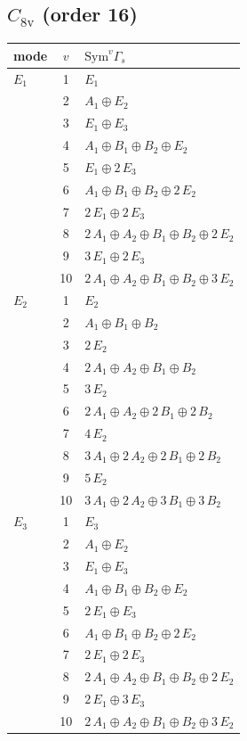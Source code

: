 \documentclass[11pt]{article}
\begin{document}
\subsection*{$C_{8\mathrm{v}}$ \quad (order 16)}
\begin{longtable}{l c p{}}
\hline mode & $v$ & $\mathrm{Sym}^v\Gamma_s$\\ \hline\endhead
$E_{1}$ & 1 & $E_{1}$\\
 & 2 & $A_{1}\oplus E_{2}$\\
 & 3 & $E_{1}\oplus E_{3}$\\
 & 4 & $A_{1}\oplus B_{1}\oplus B_{2}\oplus E_{2}$\\
 & 5 & $E_{1}\oplus 2\,E_{3}$\\
 & 6 & $A_{1}\oplus B_{1}\oplus B_{2}\oplus 2\,E_{2}$\\
 & 7 & $2\,E_{1}\oplus 2\,E_{3}$\\
 & 8 & $2\,A_{1}\oplus A_{2}\oplus B_{1}\oplus B_{2}\oplus 2\,E_{2}$\\
 & 9 & $3\,E_{1}\oplus 2\,E_{3}$\\
 & 10 & $2\,A_{1}\oplus A_{2}\oplus B_{1}\oplus B_{2}\oplus 3\,E_{2}$\\
\hline
$E_{2}$ & 1 & $E_{2}$\\
 & 2 & $A_{1}\oplus B_{1}\oplus B_{2}$\\
 & 3 & $2\,E_{2}$\\
 & 4 & $2\,A_{1}\oplus A_{2}\oplus B_{1}\oplus B_{2}$\\
 & 5 & $3\,E_{2}$\\
 & 6 & $2\,A_{1}\oplus A_{2}\oplus 2\,B_{1}\oplus 2\,B_{2}$\\
 & 7 & $4\,E_{2}$\\
 & 8 & $3\,A_{1}\oplus 2\,A_{2}\oplus 2\,B_{1}\oplus 2\,B_{2}$\\
 & 9 & $5\,E_{2}$\\
 & 10 & $3\,A_{1}\oplus 2\,A_{2}\oplus 3\,B_{1}\oplus 3\,B_{2}$\\
\hline
$E_{3}$ & 1 & $E_{3}$\\
 & 2 & $A_{1}\oplus E_{2}$\\
 & 3 & $E_{1}\oplus E_{3}$\\
 & 4 & $A_{1}\oplus B_{1}\oplus B_{2}\oplus E_{2}$\\
 & 5 & $2\,E_{1}\oplus E_{3}$\\
 & 6 & $A_{1}\oplus B_{1}\oplus B_{2}\oplus 2\,E_{2}$\\
 & 7 & $2\,E_{1}\oplus 2\,E_{3}$\\
 & 8 & $2\,A_{1}\oplus A_{2}\oplus B_{1}\oplus B_{2}\oplus 2\,E_{2}$\\
 & 9 & $2\,E_{1}\oplus 3\,E_{3}$\\
 & 10 & $2\,A_{1}\oplus A_{2}\oplus B_{1}\oplus B_{2}\oplus 3\,E_{2}$\\
\hline
\end{longtable}
\end{document}
